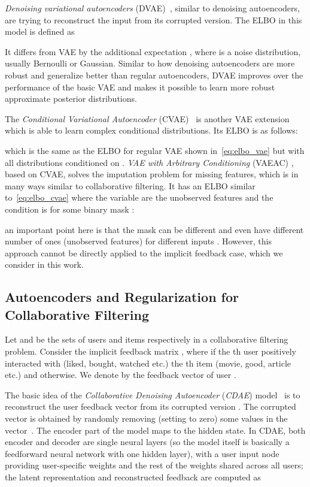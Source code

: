 \documentclass[sigconf,authorversion]{acmart}
\begin{document}
\emph{Denoising variational autoencoders} (DVAE)~\cite{im2017denoising,shu2018amortized}, similar to denoising autoencoders, are trying to reconstruct the input from its corrupted version. The ELBO in this model is defined as


\noindent
It differs from VAE by the additional expectation , where  is a noise distribution, usually Bernoulli or Gaussian. Similar to how denoising autoencoders are more robust and generalize better than regular autoencoders, DVAE improves over the performance of the basic VAE and makes it possible to learn more robust approximate posterior distributions.

The \emph{Conditional Variational Autoencoder} (CVAE)~\cite{sohn2015learning} is another VAE extension which is able to learn complex conditional distributions. Its ELBO is as follows:


which is the same as the ELBO for regular VAE shown in~\eqref{eq:elbo_vae} but with all distributions conditioned on . \emph{VAE with Arbitrary Conditioning} (VAEAC) \cite{DBLP:conf/iclr/IvanovFV19}, based on CVAE, solves the imputation problem for missing features, which is in many ways similar to collaborative filtering. It has an ELBO similar to~\eqref{eq:elbo_cvae} where the variable are the unobserved features  and the condition is  for some binary mask :

an important point here is that the mask  can be different and even have different number of ones (unobserved features) for different inputs . However, this approach cannot be directly applied to the implicit feedback case, which we consider in this work.

\subsection{Autoencoders and Regularization for Collaborative Filtering}\label{sec:ae_cf}

Let  and  be the sets of users and items respectively in a collaborative filtering problem. Consider the implicit feedback matrix , where  if the th user positively interacted with (liked, bought, watched etc.) the th item (movie, good, article etc.) and  otherwise. We denote by  the feedback vector of user .

The basic idea of the \emph{Collaborative Denoising Autoencoder} (\emph{CDAE}) model~\cite{wu2016collaborative} is to reconstruct the user feedback vector  from its corrupted version . The corrupted vector  is obtained by randomly removing (setting to zero) some values in the vector~. The encoder part of the model maps  to the hidden state. In CDAE, both encoder and decoder are single neural layers (so the model itself is basically a feedforward neural network with one hidden layer), with a user input node providing user-specific weights and the rest of the weights shared across all users; the latent representation  and reconstructed feedback  are computed as
\end{document}
